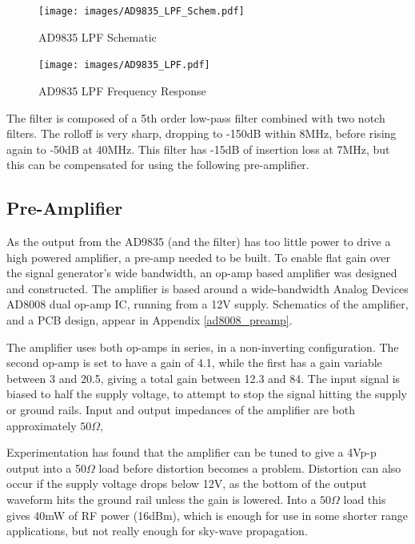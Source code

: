 \documentclass[a4paper,12pt]{article}
\begin{document}
\begin{figure}[h]
  \begin{center}
    \texttt{[image: images/AD9835\_LPF\_Schem.pdf]}
  \end{center}
  \caption{AD9835 LPF Schematic}
  \label{fig:ad9835_lpf_schem}
\end{figure}

\begin{figure}[h]
  \begin{center}
    \texttt{[image: images/AD9835\_LPF.pdf]}
  \end{center}
  \caption{AD9835 LPF Frequency Response}
  \label{fig:ad9835_lpf}
\end{figure}

The filter is composed of a 5th order low-pass filter combined with two notch filters. The rolloff is very sharp, dropping to -150dB within 8MHz, before rising again to -50dB at 40MHz. This filter has -15dB of insertion loss at 7MHz, but this can be compensated for using the following pre-amplifier.

\subsection{Pre-Amplifier}

As the output from the AD9835 (and the filter) has too little power to drive a high powered amplifier, a pre-amp needed to be built. To enable flat gain over the signal generator's wide bandwidth, an op-amp based amplifier was designed and constructed. The amplifier is based around a wide-bandwidth Analog Devices AD8008 dual op-amp IC, running from a 12V supply. Schematics of the amplifier, and a PCB design, appear in Appendix \ref{ad8008_preamp}.

The amplifier uses both op-amps in series, in a non-inverting configuration. The second op-amp is set to have a gain of 4.1, while the first has a gain variable between 3 and 20.5, giving a total gain between 12.3 and 84. The input signal is biased to half the supply voltage, to attempt to stop the signal hitting the supply or ground rails. Input and output impedances of the amplifier are both approximately $50\Omega$, 

Experimentation has found that the amplifier can be tuned to give a 4Vp-p output into a 50$\Omega$ load before distortion becomes a problem. Distortion can also occur if the supply voltage drops below 12V, as the bottom of the output waveform hits the ground rail unless the gain is lowered. Into a $50\Omega$ load this gives 40mW of RF power (16dBm), which is enough for use in some shorter range applications, but not really enough for sky-wave propagation.
\end{document}
